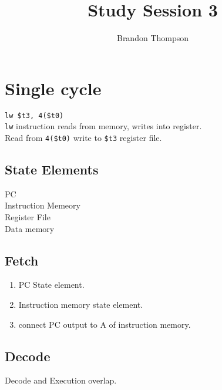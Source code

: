 \documentclass[a4paper]{article}
\begin{document}
	\title{Study Session 3}
	\author{Brandon Thompson }
	\maketitle

	\section{Single cycle}

	\verb|lw $t3, 4($t0)|\\
	\verb|lw| instruction reads from memory, writes into register.\\
	Read from \verb|4($t0)| write to \verb|$t3| register file.\\
	\subsection{State Elements}
	PC\\
	Instruction Memeory\\
	Register File\\
	Data memory
	\subsection{Fetch}
	\begin{enumerate}
		\item PC State element.
		\item Instruction memory state element.
		\item connect PC output to A of instruction memory.
	\end{enumerate}

	\subsection{Decode}
	Decode and Execution overlap.
	
\end{document}
